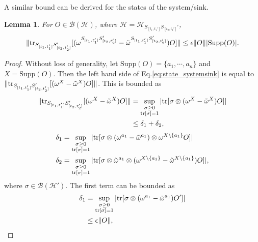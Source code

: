 \documentclass[prx,aps,amsmath,amssymb,floatfix,superscriptaddress,11pt,tightenlines,longbibliography,onecolumn,notitlepage]{revtex4-1}
\newcommand{\Tr}{\textnormal{tr}}
\newcommand{\Supp}[1]{\textnormal{Supp}(#1)}
\newtheorem{lem}{Lemma}
\begin{document}
A similar bound can be derived for the states of the system/sink.
\begin{lem}
  \label{lemma:state_systemsink}
  For $O \in \mathcal{B}(\mathcal{H})$, where $\mathcal{H} = \mathcal{H}_{S_{[t_1,t_1']} S_{[t_2,t_2']}'}$, \label{eq:state_systemsink}
  \begin{equation}
    \|\Tr_{S_{[t_1,t_1']}S_{[t_2,t_2']}'}[(\omega^{S_{[t_1,t_1']}S_{[t_2,t_2']}'} - \tilde{\omega}^{S_{[t_1,t_1']}S_{[t_2,t_2']}'} ) O ]\| \leq \epsilon \|O \| |\Supp{O}|.
  \end{equation} 
\end{lem}
\begin{proof}
  Without loss of generality, let $\text{Supp}(O)=\{a_1,\cdots, a_n \}$ and $X=\text{Supp}(O)$. Then the left hand side of Eq.\ref{eq:state_systemsink} is equal to $ \|\Tr_{S_{[t_1,t_1']}S_{[t_2,t_2']}'}[(\omega^X-\tilde{\omega}^X  ) O ]\|$. This is bounded as
  \begin{equation}
    \begin{aligned}
      \|\Tr_{S_{[t_1,t_1']}S_{[t_2,t_2']}'}[(\omega^X-\tilde{\omega}^X  ) O ]\| &= \sup_{\substack{\sigma\geq 0 \\ \Tr[\sigma]=1}}|\Tr[\sigma\otimes (\omega^X-\tilde{\omega}^X)O]| \\
      &\leq \delta_1+\delta_2,
    \end{aligned}
  \end{equation}
  \begin{equation}
  \begin{aligned}
    \delta_1&=  \sup_{\substack{\sigma\geq 0 \\ \Tr[\sigma]=1}} |\Tr[\sigma\otimes (\omega^{a_1}-\tilde{\omega}^{a_1})\otimes \omega^{X\setminus \{a_1 \}} O]|  \\
    \delta_2&= \sup_{\substack{\sigma\geq 0 \\ \Tr[\sigma]=1}} |\Tr[\sigma \otimes \tilde{\omega}^{a_1}\otimes(\omega^{X\setminus \{a_1 \}} - \tilde{\omega}^{X\setminus \{a_1 \}})O]|,
  \end{aligned}
  \end{equation}
  where $\sigma\in \mathcal{B}(\mathcal{H}')$. The first term can be bounded as
  \begin{equation}
    \begin{aligned}
      \delta_1 &=  \sup_{\substack{\sigma\geq 0 \\ \Tr[\sigma]=1}}|\Tr[\sigma\otimes (\omega^{a_1} - \tilde{\omega}^{a_1})O']| \\
      &\leq \epsilon\|O\|,

\end{aligned}
\end{equation}
\end{proof}
\end{document}
